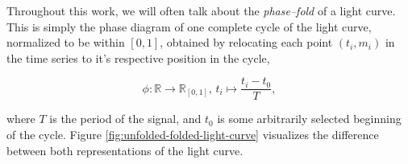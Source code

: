 Throughout this work, we will often talk about the \emph{phase--fold} of a light curve. This is simply the phase diagram of one complete cycle of the light curve, normalized to be within $[0,1]$, obtained by relocating each point $(t_i, m_i)$ in the time series to it's respective position in the cycle,

\begin{equation}
\label{eq:phase-fold}
\phi \colon \mathbb{R} \to \mathbb{R}_{[0, 1]},\, t_i \mapsto \frac{t_i - t_0}{T},
\end{equation}

where $T$ is the period of the signal, and $t_0$ is some arbitrarily selected beginning of the cycle. Figure \ref{fig:unfolded-folded-light-curve} visualizes the difference between both representations of the light curve.\\

